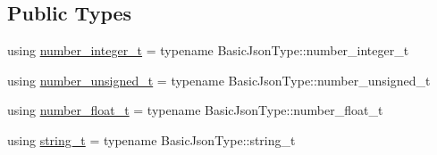 \subsection*{Public Types}
\begin{DoxyCompactItemize}
\item 
using \hyperlink{classnlohmann_1_1detail_1_1json__sax__dom__parser_a3d5cd67d179aa7422ce90e54984a441e}{number\+\_\+integer\+\_\+t} = typename Basic\+Json\+Type\+::number\+\_\+integer\+\_\+t
\item 
using \hyperlink{classnlohmann_1_1detail_1_1json__sax__dom__parser_a90f19b272530a479db81db11be2ea15c}{number\+\_\+unsigned\+\_\+t} = typename Basic\+Json\+Type\+::number\+\_\+unsigned\+\_\+t
\item 
using \hyperlink{classnlohmann_1_1detail_1_1json__sax__dom__parser_ad8da3aad0147b18b3cb76868480300fe}{number\+\_\+float\+\_\+t} = typename Basic\+Json\+Type\+::number\+\_\+float\+\_\+t
\item 
using \hyperlink{classnlohmann_1_1detail_1_1json__sax__dom__parser_afd4d961ab2a6b01cbe6e840f7fb90cdc}{string\+\_\+t} = typename Basic\+Json\+Type\+::string\+\_\+t
\end{DoxyCompactItemize}
